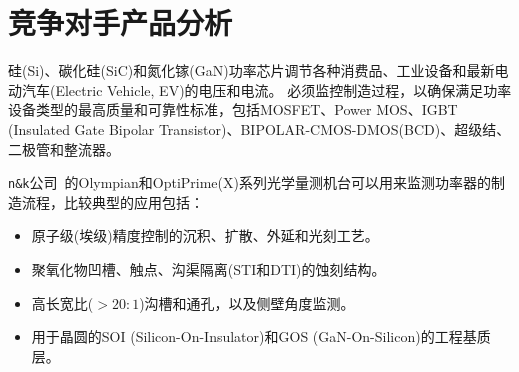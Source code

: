 \section{竞争对手产品分析~\label{竞争对手产品分析}}

硅(Si)、碳化硅(SiC)和氮化镓(GaN)功率芯片调节各种消费品、工业设备和最新电动汽车(Electric Vehicle, EV)的电压和电流。
必须监控制造过程，以确保满足功率设备类型的最高质量和可靠性标准，包括MOSFET、Power MOS、IGBT (Insulated Gate Bipolar Transistor)、BIPOLAR-CMOS-DMOS(BCD)、超级结、二极管和整流器。

\texttt{n\&k}公司~\cite{nktechnology}的Olympian和OptiPrime(X)系列光学量测机台可以用来监测功率器的制造流程，比较典型的应用包括：
\begin{itemize}[leftmargin=*] 
\setlength{\itemsep}{2pt}
\setlength{\parsep}{0pt}
\setlength{\parskip}{0pt}
\item 原子级(埃级)精度控制的沉积、扩散、外延和光刻工艺。
\item 聚氧化物凹槽、触点、沟渠隔离(STI和DTI)的蚀刻结构。
\item 高长宽比($>20:1$)沟槽和通孔，以及侧壁角度监测。
\item 用于晶圆的SOI (Silicon-On-Insulator)和GOS (GaN-On-Silicon)的工程基质层。
\end{itemize}